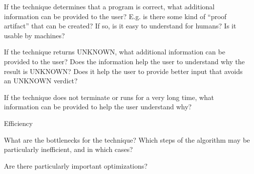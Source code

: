 \documentclass[a4paper]{article}
\begin{document}
\begin{minipage}[t]{0.16\linewidth}
\begin{betterlist}
\begin{betterlist}
{{\begin{betterlist}
					\end{betterlist}

				}}
			\item If the technique determines that a program is correct, what additional information can be provided to the user? E.g. is there some kind of \enquote{proof artifact} that can be created? If so, is it easy to understand for humans? Is it usable by machines?

			\item If the technique returns UNKNOWN, what additional information can be provided to the user? Does the information help the user to understand why the result is UNKNOWN? Does it help the user to provide better input that avoids an UNKNOWN verdict?

			\item If the technique does not terminate or runs for a very long time, what information can be provided to help the user understand why?

		\end{betterlist}
		\item \alert{Efficiency}
		\begin{betterlist}
			\item What are the bottlenecks for the technique? Which steps of the algorithm may be particularly inefficient, and in which cases?

			\item Are there particularly important optimizations?


\end{betterlist}
\end{betterlist}
\end{minipage}
\end{document}
